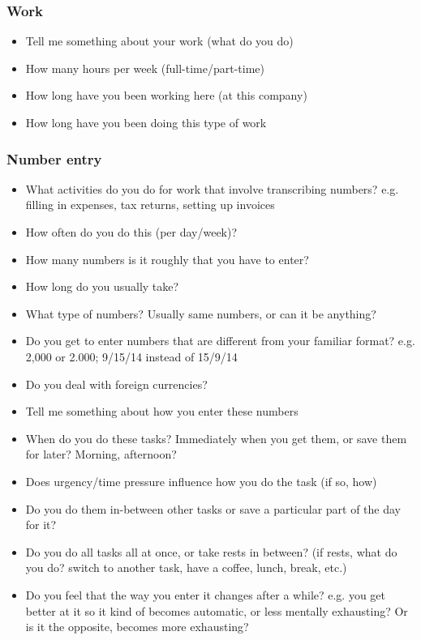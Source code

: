 \subsubsection{Work}
\begin{itemize}
\item Tell me something about your work (what do you do)
\item  How many hours per week (full-time/part-time)
\item How long have you been working here (at this company) \item How long have you been doing this type of work
\end{itemize}
\subsubsection{Number entry}
\begin{itemize}
\item  What activities do you do for work that involve transcribing numbers?
e.g. filling in expenses, tax returns, setting up invoices
\item How often do you do this (per day/week)?
\item How many numbers is it roughly that you have to enter?
\item How long do you usually take?
\item What type of numbers? Usually same numbers, or can it be anything?
\item Do you get to enter numbers that are different from your familiar format?
e.g. 2,000 or 2.000; 9/15/14 instead of 15/9/14
\item Do you deal with foreign currencies?
\item Tell me something about how you enter these numbers
\item When do you do these tasks? Immediately when you get them, or save them for later? Morning, afternoon?
\item Does urgency/time pressure influence how you do the task (if so, how)
\item Do you do them in-between other tasks or save a particular part of the day for it?
\item Do you do all tasks all at once, or take rests in between?
(if rests, what do you do? switch to another task, have a coffee, lunch, break, etc.)
\item Do you feel that the way you enter it changes after a while?
e.g. you get better at it so it kind of becomes automatic, or less mentally exhausting? Or is it the opposite, becomes more exhausting?

\end{itemize}
